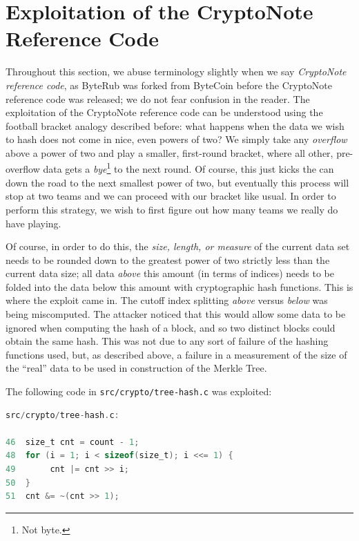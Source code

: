 \documentclass{mrl}
\begin{document}
\section{Exploitation of the CryptoNote Reference Code}
Throughout this section, we abuse terminology slightly when we say \emph{CryptoNote reference code}, as ByteRub was forked from ByteCoin before the CryptoNote reference code was released; we do not fear confusion in the reader. The exploitation of the CryptoNote reference code can be understood using the football bracket analogy described before: what happens when the data we wish to hash does not come in nice, even powers of two? We simply take any \emph{overflow} above a power of two and play a smaller, first-round bracket, where all other, pre-overflow data gets a \emph{bye}\footnote{Not byte.} to the next round. Of course, this just kicks the can down the road to the next smallest power of two, but eventually this process will stop at two teams and we can proceed with our bracket like usual. In order to perform this strategy, we wish to first figure out how many teams we really do have playing.

Of course, in order to do this, the \emph{size, length, or measure} of the current data set needs to be rounded down to the greatest power of two strictly less than the current data size; all data \emph{above} this amount (in terms of indices) needs to be folded into the data below this amount with cryptographic hash functions. This is where the exploit came in. The cutoff index splitting \emph{above} versus \emph{below} was being miscomputed. The attacker noticed that this would allow some data to be ignored when computing the hash of a block, and so two distinct blocks could obtain the same hash. This was not due to any sort of failure of the hashing functions used, but, as described above, a failure in a measurement of the size of the ``real'' data to be used in construction of the Merkle Tree.

The following code in \texttt{src/crypto/tree-hash.c} was exploited:

\begin{lstlisting}[language=C]
src/crypto/tree-hash.c:

46  size_t cnt = count - 1;
48  for (i = 1; i < sizeof(size_t); i <<= 1) {
49       cnt |= cnt >> i;
50  }
51  cnt &= ~(cnt >> 1);

\end{lstlisting}
\end{document}
